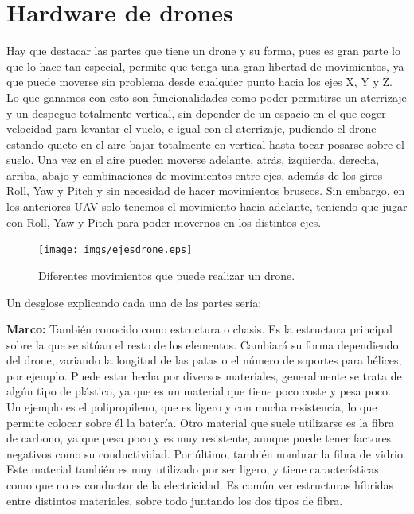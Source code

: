 \section{Hardware de drones}
\hspace{1 cm} Hay que destacar las partes que tiene un drone y su forma, pues es gran parte lo que lo hace tan especial, permite que tenga una gran libertad de movimientos, ya que puede moverse sin problema desde cualquier punto hacia los ejes X, Y y Z. Lo que ganamos con esto son funcionalidades como poder permitirse un aterrizaje y un despegue totalmente vertical, sin depender de un espacio en el que coger velocidad para levantar el vuelo, e igual con el aterrizaje, pudiendo el drone estando quieto en el aire bajar totalmente en vertical hasta tocar posarse sobre el suelo. Una vez en el aire pueden moverse adelante, atr\'as, izquierda, derecha, arriba, abajo y combinaciones de movimientos entre ejes, adem\'as de los giros Roll, Yaw y Pitch y sin necesidad de hacer movimientos bruscos. Sin embargo, en los anteriores UAV solo tenemos el movimiento hacia adelante, teniendo que jugar con Roll, Yaw y Pitch para poder movernos en los distintos ejes.

\begin{figure}[ht]
	\centering
		\texttt{[image: imgs/ejesdrone.eps]}
		\caption{Diferentes movimientos que puede realizar un drone.}
	\label{fig:ejesdrone}
\end{figure}

\hspace{1 cm} Un desglose explicando cada una de las partes ser\'ia:

\hspace{1 cm}\textbf{Marco:} Tambi\'en conocido como estructura o chasis. Es la estructura principal sobre la que se sit\'uan el resto de los elementos. Cambiar\'a su forma dependiendo del drone, variando la longitud de las patas o el n\'umero de soportes para h\'elices, por ejemplo. Puede estar hecha por diversos materiales, generalmente se trata de alg\'un tipo de pl\'astico, ya que es un material que tiene poco coste y pesa poco. Un ejemplo es el polipropileno, que es ligero y con mucha resistencia, lo que permite colocar sobre \'el la bater\'ia. Otro material que suele utilizarse es la fibra de carbono, ya que pesa poco y es muy resistente, aunque puede tener factores negativos como su conductividad. Por \'ultimo, tambi\'en nombrar la fibra de vidrio. Este material tambi\'en es muy utilizado por ser ligero, y tiene caracter\'isticas como que no es conductor de la electricidad. Es com\'un ver estructuras h\'ibridas entre distintos materiales, sobre todo juntando los dos tipos de fibra. 

